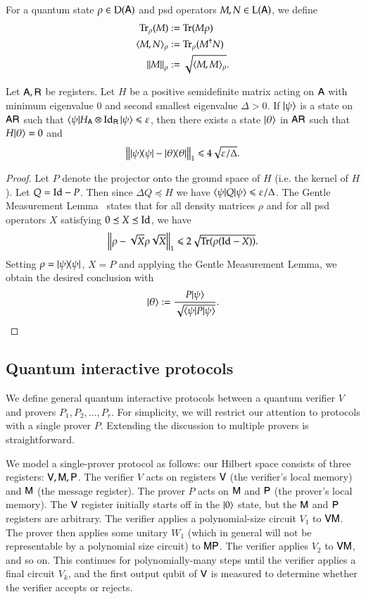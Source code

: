 For a quantum state $\rho \in \mathrm{D}({\mathsf{A}})$ and psd operators $M,N \in \mathrm{L}({\mathsf{A}})$, we define 
\begin{align}
	\operatorname{Tr}_\rho(M) &:= \operatorname{Tr}(M \rho) \\
	\langle M, N \rangle_\rho &:= \operatorname{Tr}_\rho (M^\dagger N) \\
	\left\lVert M \right\rVert_\rho & := \sqrt{ \langle M, M \rangle_\rho}.
\end{align}

\begin{lemma}
\label{lem:closeness_to_groundspace}
	Let ${\mathsf{A}}, {\mathsf{R}}$ be registers. Let $H$ be a positive semidefinite matrix acting on ${\mathsf{A}}$ with minimum eigenvalue $0$ and second smallest eigenvalue $\Delta > 0$. If $|\psi\rangle$ is a state on ${\mathsf{A}} {\mathsf{R}}$ such that $\langle\psi| H_{{\mathsf{A}}} \otimes \mathop{\mathrm{Id}}\!\mathinner{}_{{\mathsf{R}}} |\psi\rangle \leqslant \varepsilon$, then there exists a state $|\theta\rangle$ in ${\mathsf{A}} {\mathsf{R}}$ such that $H |\theta\rangle = 0$ and
	\[
		\left \| |\psi\rangle\! \langle \psi| - |\theta\rangle\! \langle \theta| \right \|_1 \leqslant 4\sqrt{\varepsilon/\Delta}.
	\]
\end{lemma}
\begin{proof}
	Let $P$ denote the projector onto the ground space of $H$ (i.e. the kernel of $H$). Let $Q = \mathop{\mathrm{Id}}\!\mathinner{} - P$. Then since $\Delta Q \preceq H$ we have $\langle\psi| Q |\psi\rangle \leqslant \varepsilon/\Delta$. The Gentle Measurement Lemma~\cite{ogawa2002new} states that for all density matrices $\rho$ and for all psd operators $X$ satisfying $0 \preceq X \preceq \mathop{\mathrm{Id}}\!\mathinner{}$, we have
	\[
		\left \| \rho - \sqrt{X}\rho \sqrt{X}  \right \|_1 \leqslant 2 \sqrt{ \operatorname{Tr}(\rho (\mathop{\mathrm{Id}}\!\mathinner{} - X))}.
	\]
	Setting $\rho = |\psi\rangle\! \langle \psi|$, $X = P$ and applying the Gentle Measurement Lemma, we obtain the desired conclusion with
	\[
		|\theta\rangle := \frac{ P |\psi\rangle}{\sqrt{ \langle\psi| P |\psi\rangle}}.
	\]
\end{proof}

\subsection{Quantum interactive protocols} 

We define general quantum interactive protocols between a quantum verifier $V$ and provers $P_1,P_2,\ldots,P_r$. For simplicity, we will restrict our attention to protocols with a single prover $P$. Extending the discussion to multiple provers is straightforward. 

We model a single-prover protocol as follows: our Hilbert space consists of three registers: ${\mathsf{V}}, {\mathsf{M}}, {\mathsf{P}}$. The verifier $V$ acts on registers ${\mathsf{V}}$ (the verifier's local memory) and ${\mathsf{M}}$ (the message register). The prover $P$ acts on ${\mathsf{M}}$ and ${\mathsf{P}}$ (the prover's local memory). The ${\mathsf{V}}$ register initially starts off in the $|0\rangle$ state, but the ${\mathsf{M}}$ and ${\mathsf{P}}$ registers are arbitrary. The verifier applies a polynomial-size circuit $V_1$ to ${\mathsf{V}} {\mathsf{M}}$. The prover then applies some unitary $W_1$ (which in general will not be representable by a polynomial size circuit) to ${\mathsf{M}} {\mathsf{P}}$. The verifier applies $V_2$ to ${\mathsf{V}} {\mathsf{M}}$, and so on. This continues for polynomially-many steps until the verifier applies a final circuit $V_k$, and the first output qubit of ${\mathsf{V}}$ is measured to determine whether the verifier accepts or rejects.


